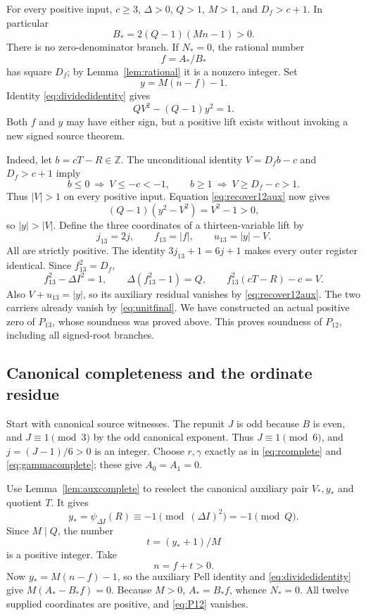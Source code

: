 \documentclass[11pt,a4paper]{article}
\theoremstyle{definition}
\theoremstyle{remark}
\newcommand{\Z}{\mathbb Z}
\begin{document}
For every positive input, \(c\ge3\), \(\Delta>0\), \(Q>1\), \(M>1\),
and \(D_f>c+1\). In particular
\[
 B_*=2(Q-1)(Mn-1)>0.
\]
There is no zero-denominator branch. If \(N_*=0\), the rational number
\[
 f=A_*/B_*
\]
has square \(D_f\); by Lemma~\ref{lem:rational} it is a nonzero integer.
Set
\[
 y=M(n-f)-1.
\]
Identity \eqref{eq:dividedidentity} gives
\begin{equation}
 QV^2-(Q-1)y^2=1.                           \label{eq:recover12aux}
\end{equation}
Both \(f\) and \(y\) may have either sign, but a positive lift exists
without invoking a new signed source theorem.

Indeed, let \(b=cT-R\in\Z\). The unconditional identity \(V=D_fb-c\)
and \(D_f>c+1\) imply
\[
 b\le0\ \Longrightarrow\ V\le-c<-1,\qquad
 b\ge1\ \Longrightarrow\ V\ge D_f-c>1.
\]
Thus \(|V|>1\) on every positive input. Equation
\eqref{eq:recover12aux} now gives
\[
 (Q-1)(y^2-V^2)=V^2-1>0,
\]
so \(|y|>|V|\). Define the three coordinates of a thirteen-variable lift
by
\begin{equation}
 j_{13}=2j,\qquad f_{13}=|f|,\qquad u_{13}=|y|-V.
                                                        \label{eq:lift12to13}
\end{equation}
All are strictly positive. The identity
\(3j_{13}+1=6j+1\) makes every outer register identical.
Since \(f_{13}^2=D_f\),
\[
 f_{13}^2-\Delta I^2=1,\qquad
 \Delta(f_{13}^2-1)=Q,\qquad
 f_{13}^2(cT-R)-c=V.
\]
Also \(V+u_{13}=|y|\), so its auxiliary residual vanishes by
\eqref{eq:recover12aux}. The two carriers already vanish by
\eqref{eq:unitfinal}. We have constructed an actual positive zero of
\(P_{13}\), whose soundness was proved above. This proves soundness of
\(P_{12}\), including all signed-root branches.

\subsection{Canonical completeness and the ordinate residue}

Start with canonical source witnesses. The repunit \(J\) is odd because
\(B\) is even, and \(J\equiv1\pmod3\) by the odd canonical exponent.
Thus \(J\equiv1\pmod6\), and \(j=(J-1)/6>0\) is an integer.
Choose \(r,\gamma\) exactly as in \eqref{eq:rcomplete} and
\eqref{eq:gammacomplete}; these give \(A_0=A_1=0\).

Use Lemma~\ref{lem:auxcomplete} to reselect the canonical auxiliary
pair \(V_*,y_*\) and quotient \(T\). It gives
\[
 y_*=\psi_{\Delta I}(R)\equiv-1\pmod{(\Delta I)^2}
                                  =-1\pmod Q.
\]
Since \(M\mid Q\), the number
\[
 t=(y_*+1)/M
\]
is a positive integer. Take
\begin{equation}
 n=f+t>0.                                  \label{eq:ncomplete12}
\end{equation}
Now \(y_*=M(n-f)-1\), so the auxiliary Pell identity and
\eqref{eq:dividedidentity} give \(M(A_*-B_*f)=0\).
Because \(M>0\), \(A_*=B_*f\), whence \(N_*=0\).
All twelve supplied coordinates are positive, and
\eqref{eq:P12} vanishes.
\end{document}

